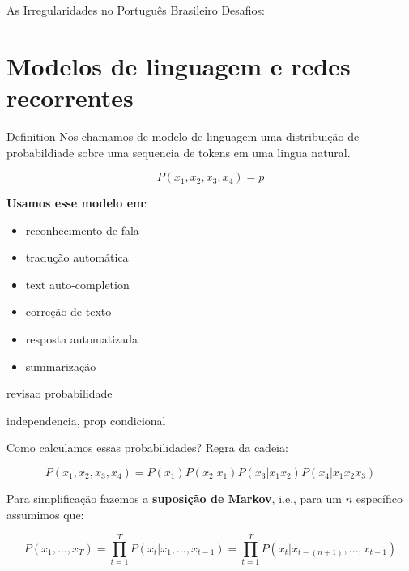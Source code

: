 \documentclass[10pt]{beamer}
\begin{document}
\begin{frame}[fragile]{As Irregularidades no Português Brasileiro}
Desafios:
\begin{itemize}
\vspace{0.2cm}
\vspace{0.2cm}
\end{itemize}
\end{frame}

\section{Modelos de linguagem e redes recorrentes}


\begin{frame}{Definition}
Nos chamamos de \alert{modelo de linguagem} uma distribuição de probabildiade sobre uma sequencia de tokens em uma lingua natural.

\[
P(x_1,x_2,x_3,x_4) = p
\]

\textbf{Usamos esse modelo em}:
\begin{itemize}
\item reconhecimento de fala
\item tradução automática
\item text auto-completion
\item correção de texto
\item resposta automatizada
\item summarização
\end{itemize}


\end{frame}

\begin{frame}{revisao probabilidade}

independencia, prop condicional

\end{frame}


\begin{frame}{Como calculamos essas probabilidades?}
Regra da cadeia:

\begin{equation*}
P(x_1,x_2,x_3,x_4) = P(x_1)P(x_2\vert x_1)P(x_3\vert x_1x_2)P(x_4\vert x_1x_2x_3)
\end{equation*}

\vspace{0.3cm}

Para simplificação fazemos a \textbf{suposição de Markov}, i.e., para um  $n$ específico assumimos que:

\begin{equation*}
P(x_1, \dots, x_T) = \prod_{t=1}^{T} P(x_t \vert x_1, \dots, x_{t-1}) = \prod_{t=1}^{T} P(x_{t} \vert x_{t - (n+1)}, \dots, x_{t-1})
\end{equation*} 

\end{frame}
\end{document}
